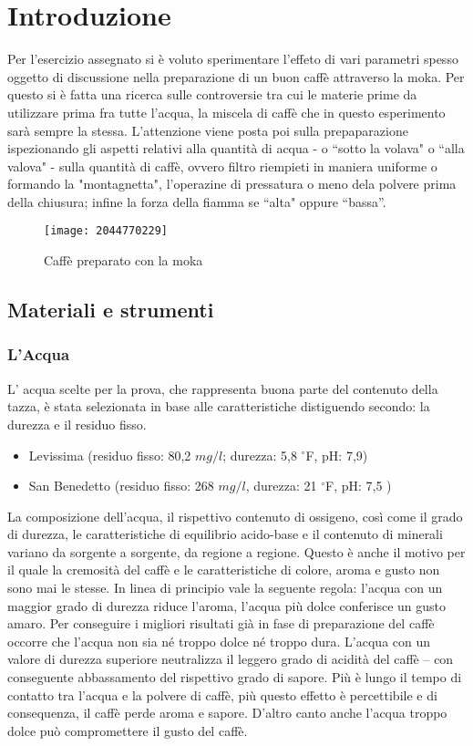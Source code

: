 \chapter{Introduzione}
Per l'esercizio assegnato si è voluto sperimentare l'effeto di vari parametri spesso oggetto di discussione nella preparazione di un buon caffè attraverso la moka.
Per questo si è fatta una ricerca sulle controversie tra cui le materie prime da utilizzare prima fra tutte l'acqua, la miscela di caffè che in questo esperimento sarà sempre la stessa.%
L'attenzione viene posta poi sulla prepaparazione ispezionando gli aspetti relativi alla quantità di acqua - o “sotto la volava" o “alla valova" - sulla quantità di caffè, ovvero filtro riempieti in maniera uniforme o formando la "montagnetta", l'operazine di pressatura o meno dela polvere prima della chiusura; infine la forza della fiamma se “alta" oppure “bassa”.
\begin{figure}[h]
  \centering
  \texttt{[image: 2044770229]}
  \caption{Caffè preparato con la moka}
  \label{fig:moka}
\end{figure}
\section{Materiali e strumenti}
\subsection{L'Acqua}
L' acqua scelte per la prova, che rappresenta buona parte del contenuto della tazza, è stata selezionata in base alle caratteristiche distiguendo secondo: la durezza e il residuo fisso.
\begin{itemize}
  \item Levissima (residuo fisso: 80,2 $mg/l$; durezza: 5,8 $^{\circ}$F, pH: 7,9)
  \item San Benedetto (residuo fisso: 268 $mg/l$, durezza: 21 $^{\circ}$F, pH: 7,5 )
\end{itemize}
La composizione dell’acqua, il rispettivo contenuto di ossigeno, così come il grado di durezza, le caratteristiche di equilibrio acido-base e il contenuto di minerali variano da sorgente a sorgente, da regione a regione. Questo è anche il motivo per il quale la cremosità del caffè e le caratteristiche di colore, aroma e gusto non sono mai le stesse.
In linea di principio vale la seguente regola: l’acqua con un maggior grado di durezza riduce l’aroma, l’acqua più dolce conferisce un gusto amaro.
Per conseguire i migliori risultati già in fase di preparazione del caffè occorre che l’acqua non sia né troppo dolce né troppo dura. L’acqua con un valore di durezza superiore neutralizza il leggero grado di acidità del caffè – con conseguente abbassamento del rispettivo grado di sapore. Più è lungo il tempo di contatto tra l'acqua e la polvere di caffè, più questo effetto è percettibile e di consequenza, il caffè perde aroma e sapore. D’altro canto anche l’acqua troppo dolce può compromettere il gusto del caffè\cite{mo_2017}\cite{acqua}.

